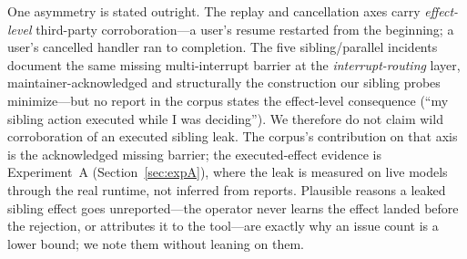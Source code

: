 \documentclass[10pt,journal,compsoc]{IEEEtran}
\begin{document}
One asymmetry is stated outright. The replay and cancellation axes carry
\emph{effect-level} third-party corroboration---a user's resume restarted from
the beginning; a user's cancelled handler ran to completion. The five
sibling/parallel incidents document the same missing multi-interrupt barrier
at the \emph{interrupt-routing} layer, maintainer-acknowledged and structurally
the construction our sibling probes minimize---but no report in the corpus
states the effect-level consequence (``my sibling action executed while I was
deciding''). We therefore do not claim wild corroboration of an executed
sibling leak. The corpus's contribution on that axis is the acknowledged
missing barrier; the executed-effect evidence is Experiment~A
(Section~\ref{sec:expA}), where the leak is measured on live models through
the real runtime, not inferred from reports. Plausible reasons a leaked
sibling effect goes unreported---the operator never learns the effect landed
before the rejection, or attributes it to the tool---are exactly why an issue
count is a lower bound; we note them without leaning on them.
\end{document}
